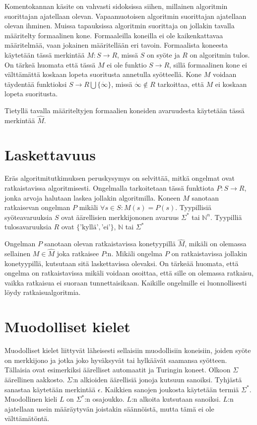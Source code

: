 \documentclass[a4paper, 12pt]{article}
\theoremstyle{definition}
\theoremstyle{plain}
\begin{document}
Komentokannan käsite on vahvasti sidoksissa siihen, millainen algoritmin suorittajan ajatellaan olevan. Vapaamuotoisen algoritmin suorittajan ajatellaan olevan ihminen. Muissa tapauksissa algoritmin suorittaja on jollakin tavalla määritelty formaalinen kone. Formaaleilla koneilla ei ole kaikenkattavaa määritelmää, vaan jokainen määritellään eri tavoin. Formaalista koneesta käytetään tässä merkintää $M : S \rightarrow R$, missä $S$ on syöte ja $R$ on algoritmin tulos. On tärkeä huomata että tässä $M$ ei ole funktio $S \rightarrow R$, sillä formaalinen kone ei välttämättä koskaan lopeta suoritusta annetulla syötteellä. Kone $M$ voidaan täydentää funktioksi $S \rightarrow R \bigcup \{ \dot{\infty} \}$, missä $\dot{\infty} \notin R$ tarkoittaa, että $M$ ei koskaan lopeta suoritusta.

Tietyllä tavalla määriteltyjen formaalien koneiden avaruudesta käytetään tässä merkintää $\hat{M}$.


\section{Laskettavuus}
Eräs algoritmitutkimuksen peruskysymys on selvittää, mitkä ongelmat ovat ratkaistavissa algoritmisesti. Ongelmalla tarkoitetaan tässä funktiota $P: S \rightarrow R$, jonka arvoja halutaan laskea jollakin algoritmilla. Koneen $M$ sanotaan ratkaisevan ongelman $P$ mikäli $\forall s \in S : M(s) = P(s)$. Tyypillisiä syöteavaruuksia $S$ ovat äärellisien merkkijononen avaruus $\Sigma^*$ tai $\mathbb{N}^n$. Tyypilliä tulosavaruuksia $R$ ovat $\{\text{'kyllä'}, \text{'ei'}\}$, $\mathbb{N}$ tai $\Sigma^*$

Ongelman $P$ sanotaan olevan ratkaistavissa konetyypillä $\hat{M}$, mikäli on olemassa sellainen $M \in \hat{M}$ joka ratkaisee $P$:n. Mikäli ongelma $P$ on ratkaistavissa jollakin konetyypillä, kutsutaan sitä laskettavissa olevaksi. On tärkeää huomata, että ongelma on ratkaistavissa mikäli voidaan osoittaa, että sille on olemassa ratkaisu, vaikka ratkaisua ei suoraan tunnettaisikaan. Kaikille ongelmille ei luonnollisesti löydy ratkaisualgoritmia.

\section{Muodolliset kielet}

Muodolliset kielet liittyvät läheisesti sellaisiin muodollisiin koneisiin, joiden syöte on merkkijono ja jotka joko hyväksyvät tai hylkäävät saamansa syötteen. Tällaisia ovat esimerkiksi äärelliset automaatit ja Turingin koneet. Olkoon $\Sigma$ äärellinen aakkosto. $\Sigma$:n alkioiden äärellisiä jonoja kutsuun sanoiksi. Tyhjästä sanastaa käytetään merkintää $\epsilon$. Kaikkien sanojen joukosta käytetään termiä $\Sigma^*$. Muodollinen kieli $L$ on $\Sigma^*$:n osajoukko. $L$:n alkoita kutsutaan sanoiksi. $L$:n ajatellaan usein määräytyvän joistakin säännöistä, mutta tämä ei ole välttämätöntä.
\end{document}
